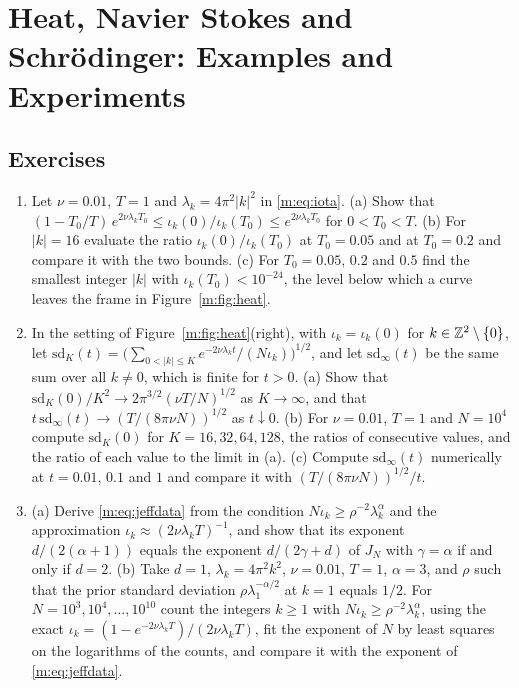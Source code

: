 \chapter{Heat, Navier Stokes and Schr\"odinger: Examples and Experiments}
\label{ch:examples}







\section*{Exercises}
\begin{enumerate}
\item Let $\nu=0.01$, $T=1$ and $\lambda_k=4\pi^2|k|^2$ in \eqref{m:eq:iota}. (a) Show that $(1-T_0/T)\,e^{2\nu\lambda_kT_0}\le\iota_k(0)/\iota_k(T_0)\le e^{2\nu\lambda_kT_0}$ for $0<T_0<T$. (b) For $|k|=16$ evaluate the ratio $\iota_k(0)/\iota_k(T_0)$ at $T_0=0.05$ and at $T_0=0.2$ and compare it with the two bounds. (c) For $T_0=0.05$, $0.2$ and $0.5$ find the smallest integer $|k|$ with $\iota_k(T_0)<10^{-24}$, the level below which a curve leaves the frame in Figure~\ref{m:fig:heat}.
\item In the setting of Figure~\ref{m:fig:heat}(right), with $\iota_k=\iota_k(0)$ for $k\in\mathbb{Z}^2\setminus\{0\}$, let $\mathrm{sd}_K(t)=\big(\sum_{0<|k|\le K}e^{-2\nu\lambda_kt}/(N\iota_k)\big)^{1/2}$, and let $\mathrm{sd}_\infty(t)$ be the same sum over all $k\ne0$, which is finite for $t>0$. (a) Show that $\mathrm{sd}_K(0)/K^2\to2\pi^{3/2}(\nu T/N)^{1/2}$ as $K\to\infty$, and that $t\,\mathrm{sd}_\infty(t)\to(T/(8\pi\nu N))^{1/2}$ as $t\downarrow0$. (b) For $\nu=0.01$, $T=1$ and $N=10^4$ compute $\mathrm{sd}_K(0)$ for $K=16,32,64,128$, the ratios of consecutive values, and the ratio of each value to the limit in (a). (c) Compute $\mathrm{sd}_\infty(t)$ numerically at $t=0.01$, $0.1$ and $1$ and compare it with $(T/(8\pi\nu N))^{1/2}/t$.
\item (a) Derive \eqref{m:eq:jeffdata} from the condition $N\iota_k\ge\rho^{-2}\lambda_k^\alpha$ and the approximation $\iota_k\approx(2\nu\lambda_kT)^{-1}$, and show that its exponent $d/(2(\alpha+1))$ equals the exponent $d/(2\gamma+d)$ of $J_N$ with $\gamma=\alpha$ if and only if $d=2$. (b) Take $d=1$, $\lambda_k=4\pi^2k^2$, $\nu=0.01$, $T=1$, $\alpha=3$, and $\rho$ such that the prior standard deviation $\rho\lambda_1^{-\alpha/2}$ at $k=1$ equals $1/2$. For $N=10^3,10^4,\dots,10^{10}$ count the integers $k\ge1$ with $N\iota_k\ge\rho^{-2}\lambda_k^\alpha$, using the exact $\iota_k=(1-e^{-2\nu\lambda_kT})/(2\nu\lambda_kT)$, fit the exponent of $N$ by least squares on the logarithms of the counts, and compare it with the exponent of \eqref{m:eq:jeffdata}.

\end{enumerate}
